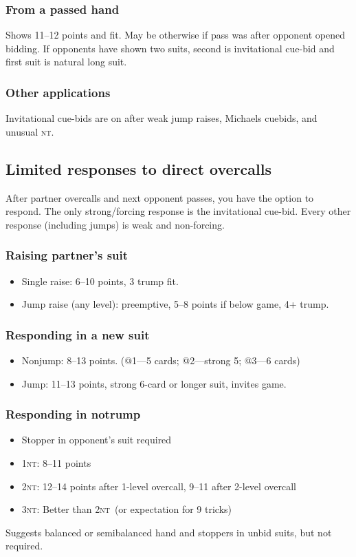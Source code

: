 \documentclass[10pt]{article}
\def\NT{\textsc{nt}}
\newcommand{\crunch}[1][1]{\vspace*{-#1pc}}
\newenvironment{mylist}[1][.5]{\begin{itemize}\itemsep=-#1\baselineskip}{\end{itemize}}
\begin{document}
\subsubsection{From a passed hand}
Shows 11--12 points and fit.  May be otherwise if pass was after opponent
opened bidding.  If opponents have shown two suits, second is invitational
cue-bid and first suit is natural long suit.

\subsubsection{Other applications}
Invitational cue-bids are on after weak jump raises, Michaels cuebids,
and unusual \NT.

\subsection{Limited responses to direct overcalls}
After partner overcalls and next opponent passes, you have the option to
respond.  The only strong/forcing response is the invitational cue-bid.
Every other response  (including jumps) is weak and non-forcing.

\subsubsection{Raising partner's suit}
\begin{mylist}[.3]
\item Single raise: 6--10 points, 3 trump fit.
\item Jump raise (any level): preemptive, 5--8 points if below game, 4+ trump.
\end{mylist}%

\subsubsection{Responding in a new suit}
\begin{mylist}[.3]
\item Nonjump: 8--13 points.  (@1---5 cards; @2---strong 5; @3---6 cards)
\item Jump: 11--13 points, strong 6-card or longer suit, invites game.
\end{mylist}

\subsubsection{Responding in notrump}
\begin{mylist}[.3]
\item Stopper in opponent's suit required
\item 1\NT: 8--11 points
\item 2\NT: 12--14 points after 1-level overcall, 9--11 after 2-level overcall
\item 3\NT: Better than 2\NT\ (or expectation for 9 tricks)
\end{mylist}
Suggests balanced or semibalanced hand and stoppers in unbid suits, but
not required.
\end{document}

